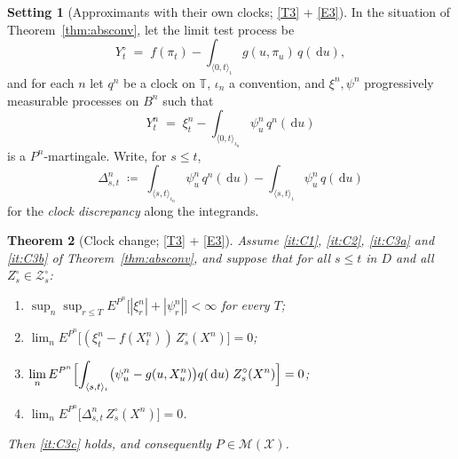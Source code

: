 \documentclass[11pt,a4paper]{article}
\theoremstyle{plain}
\newtheorem{theorem}{Theorem}[section]
\theoremstyle{definition}
\newtheorem{setting}[theorem]{Setting}
\theoremstyle{remark}
\newcommand{\T}{\mathbb{T}}                     %
\newcommand{\XX}{\mathcal{X}}                  %
\newcommand{\ZZ}{\mathcal{Z}}                  %
\newcommand{\Msol}{\mathcal{M}}
\newcommand{\dif}{\,\mathrm{d}}
\begin{document}
\begin{setting}[Approximants with their own clocks; \eqref{T3} + \eqref{E3}]
  \label{set:diffclocks}
  In the situation of Theorem~\ref{thm:absconv}, let the limit test process be
  \[
    Y^\circ_t \;=\; f(\pi_t) - \int_{\langle 0,t \rangle_\iota} g(u,\pi_u) \, q(\dif u) ,
  \]
  and for each $n$ let $q^n$ be a clock on $\T$, $\iota_n$ a convention, and
  $\xi^n, \psi^n$ progressively measurable processes on $B^n$ such that
  \begin{equation}
    \label{eq:approxclock}
    Y^n_t \;=\; \xi^n_t - \int_{\langle 0,t \rangle_{\iota_n}} \psi^n_u \, q^n(\dif u)
  \end{equation}
  is a $P^n$-martingale.  Write, for $s \leq t$,
  \begin{equation}
    \label{eq:clockdiscrepancy}
    \Delta^n_{s,t} \;\coloneqq\;
      \int_{\langle s,t \rangle_{\iota_n}} \psi^n_u \, q^n(\dif u)
      - \int_{\langle s,t \rangle_{\iota}} \psi^n_u \, q(\dif u)
  \end{equation}
  for the \emph{clock discrepancy} along the integrands.
\end{setting}

\begin{theorem}[Clock change; \eqref{T3} + \eqref{E3}]
  \label{thm:clockchange}
  Assume \ref{it:C1}, \ref{it:C2}, \ref{it:C3a} and \ref{it:C3b} of
  Theorem~\ref{thm:absconv}, and suppose that for all $s \leq t$ in $D$ and all
  $Z^\circ_s \in \ZZ^\circ_s$:
  \begin{enumerate}[label=(K\arabic*)]
  \item \label{it:K1}
    $\displaystyle \sup_{n} \sup_{r \leq T}
      E^{P^n}\bigl[ |\xi^n_r| + |\psi^n_r| \bigr] < \infty$ for every $T$;
  \item \label{it:K2}
    $\displaystyle \lim_n E^{P^n}\bigl[ (\xi^n_t - f(X^n_t)) \, Z^\circ_s(X^n) \bigr] = 0$;
  \item \label{it:K3}
    $\displaystyle \lim_n E^{P^n}\Bigl[
      \int_{\langle s,t \rangle_\iota} \bigl( \psi^n_u - g(u,X^n_u) \bigr) q(\dif u)
      \; Z^\circ_s(X^n) \Bigr] = 0$;
  \item \label{it:K4}
    $\displaystyle \lim_n E^{P^n}\bigl[ \Delta^n_{s,t} \, Z^\circ_s(X^n) \bigr] = 0$.
  \end{enumerate}
  Then \ref{it:C3c} holds, and consequently $P \in \Msol(\XX)$.
\end{theorem}
\end{document}
